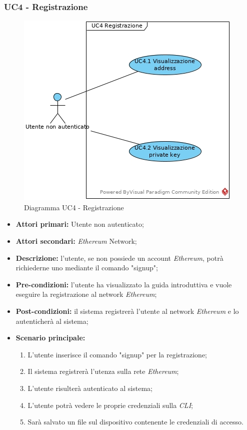 \subsubsection{UC4 - Registrazione}
\begin{figure}[h]
	\centering
	\includegraphics[width=0.7\linewidth]{res/img/UC4.jpg}
	\caption{Diagramma UC4 - Registrazione}
\end{figure}
\begin{itemize}
	\item \textbf{Attori primari:} Utente non autenticato;
	\item \textbf{Attori secondari:} \textit{Ethereum\glo} Network;
	\item \textbf{Descrizione:} l'utente, se non possiede un account \textit{Ethereum\glos}, potrà richiederne uno mediante il comando "signup"; 
	\item \textbf{Pre-condizioni:} l'utente ha visualizzato la guida introduttiva e vuole eseguire la registrazione al network \textit{Ethereum\glos};
	\item \textbf{Post-condizioni:} il sistema registrerà l'utente al network \textit{Ethereum\glo} e lo autenticherà al sistema;
	\item \textbf{Scenario principale:} 
	\begin{enumerate}
		\item L'utente inserisce il comando "signup" per la registrazione;
		\item Il sistema registrerà l'utenza sulla rete \textit{Ethereum\glos};
		\item L'utente risulterà autenticato al sistema;
		\item L'utente potrà vedere le proprie credenziali sulla \textit{CLI\glos};
		\item Sarà salvato un file sul dispositivo contenente le credenziali di accesso.
	\end{enumerate} 
\end{itemize}